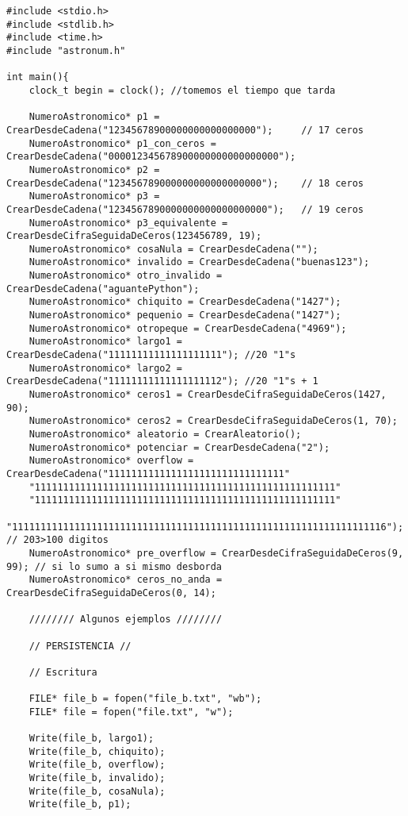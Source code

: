 \documentclass[a4paper, 12pt]{article}
\begin{document}
\begin{lstlisting}[style=C]
#include <stdio.h>
#include <stdlib.h>
#include <time.h>
#include "astronum.h"

int main(){
    clock_t begin = clock(); //tomemos el tiempo que tarda

    NumeroAstronomico* p1 = CrearDesdeCadena("12345678900000000000000000");     // 17 ceros
    NumeroAstronomico* p1_con_ceros = CrearDesdeCadena("000012345678900000000000000000");
    NumeroAstronomico* p2 = CrearDesdeCadena("123456789000000000000000000");    // 18 ceros
    NumeroAstronomico* p3 = CrearDesdeCadena("1234567890000000000000000000");   // 19 ceros
    NumeroAstronomico* p3_equivalente = CrearDesdeCifraSeguidaDeCeros(123456789, 19);
    NumeroAstronomico* cosaNula = CrearDesdeCadena("");
    NumeroAstronomico* invalido = CrearDesdeCadena("buenas123");
    NumeroAstronomico* otro_invalido = CrearDesdeCadena("aguantePython");
    NumeroAstronomico* chiquito = CrearDesdeCadena("1427");
    NumeroAstronomico* pequenio = CrearDesdeCadena("1427");
    NumeroAstronomico* otropeque = CrearDesdeCadena("4969");
    NumeroAstronomico* largo1 = CrearDesdeCadena("11111111111111111111"); //20 "1"s
    NumeroAstronomico* largo2 = CrearDesdeCadena("11111111111111111112"); //20 "1"s + 1
    NumeroAstronomico* ceros1 = CrearDesdeCifraSeguidaDeCeros(1427, 90);
    NumeroAstronomico* ceros2 = CrearDesdeCifraSeguidaDeCeros(1, 70);
    NumeroAstronomico* aleatorio = CrearAleatorio();
    NumeroAstronomico* potenciar = CrearDesdeCadena("2");
    NumeroAstronomico* overflow = CrearDesdeCadena("1111111111111111111111111111111"
    "11111111111111111111111111111111111111111111111111111"
    "11111111111111111111111111111111111111111111111111111"
    "111111111111111111111111111111111111111111111111111111111111111116"); // 203>100 digitos
    NumeroAstronomico* pre_overflow = CrearDesdeCifraSeguidaDeCeros(9, 99); // si lo sumo a si mismo desborda
    NumeroAstronomico* ceros_no_anda = CrearDesdeCifraSeguidaDeCeros(0, 14);

    //////// Algunos ejemplos ////////

    // PERSISTENCIA //

    // Escritura

    FILE* file_b = fopen("file_b.txt", "wb");
    FILE* file = fopen("file.txt", "w");

    Write(file_b, largo1);
    Write(file_b, chiquito);
    Write(file_b, overflow);
    Write(file_b, invalido);
    Write(file_b, cosaNula);
    Write(file_b, p1);


\end{lstlisting}
\end{document}
